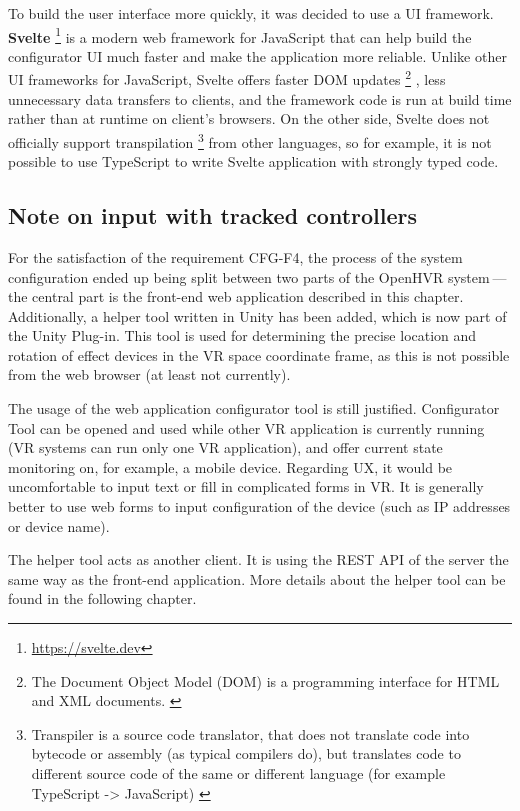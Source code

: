 To build the user interface more quickly, it was decided to use a UI framework.
\textbf{Svelte} \footnote{\href{https://svelte.dev}{https://svelte.dev}} is a modern web framework for JavaScript
that can help build the configurator UI much faster and make the application
more reliable. Unlike other UI frameworks for JavaScript, Svelte offers
faster DOM updates
\footnote{The Document Object Model (DOM) is a programming interface for HTML and XML documents. \hyperlink{dom}{}}
, less unnecessary data transfers
to clients, and the framework code is run at build time rather than at runtime on
client’s browsers. \hyperlink{svelteblog}{} On the other side, Svelte does not officially
support transpilation
\footnote{Transpiler is a source code translator, that does not translate code into bytecode or assembly (as typical compilers do), but translates code to different source code of the same or different language (for example TypeScript -> JavaScript) \hyperlink{sscd}{}}
from other languages, so for example, it is not possible
to use TypeScript to write Svelte application with strongly typed code.


\hypertarget{x-note-on-input-with-tracked-controllers}{\subsection{Note on input with tracked controllers}}
For the satisfaction of the requirement CFG-F4, the process of the system configuration
ended up being split between two parts of the OpenHVR system — the central part is the front-end web application described
in this chapter. Additionally, a helper tool written in Unity has been added,
which is now part of the Unity Plug-in. This tool is used for determining
the precise location and rotation of effect devices in the VR space
coordinate frame, as this is not possible from the web browser (at least
not currently).


The usage of the web application configurator tool is still justified.
Configurator Tool can be opened and used while other VR application is currently
running (VR systems can run only one VR application), and offer current state
monitoring on, for example, a mobile device. Regarding UX, it would be uncomfortable to
input text or fill in complicated forms in VR. It is generally better to use web forms to
input configuration of the device (such as IP addresses or device name).


The helper tool acts as another client. It is using the REST API of the server
the same way as the front-end application. More details about the helper tool
can be found in the following chapter.


